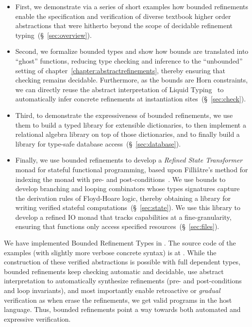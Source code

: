 \begin{itemize}
\item
First, we demonstrate via a series of short examples how bounded refinements
enable the specification and verification of diverse textbook higher order
abstractions that were hitherto beyond the scope of decidable refinement
typing~(\S~\ref{sec:overview}).

\item
Second, we formalize bounded types and show how bounds are translated
into ``ghost'' functions, reducing type checking and inference to the
``unbounded'' setting of chapter~\ref{chapter:abstractrefinements}, 
thereby ensuring that checking
remains decidable. Furthermore, as the bounds are Horn constraints, we
can directly reuse the abstract interpretation of Liquid Typing~\citep{LiquidPLDI08}
to automatically infer concrete refinements at instantiation
sites~(\S~\ref{sec:check}).

\item
Third, to demonstrate the expressiveness of bounded refinements, we
use them to build a typed library for extensible dictionaries, to
then implement a relational algebra library on top of those
dictionaries, and to finally build a library for type-safe
database access~(\S~\ref{sec:database}).

\item
Finally, we use bounded refinements to develop a \emph{Refined State Transformer}
monad for stateful functional programming, based upon Filli\^atre's method
for indexing the monad with pre- and post-conditions~\citep{Filliatre98}.
%
We use bounds to develop branching and looping combinators whose types
signatures capture the derivation rules of Floyd-Hoare logic, thereby
obtaining a library for writing verified stateful computations~(\S~\ref{sec:state}).
%
We use this library to develop a refined IO monad that tracks capabilities
at a fine-granularity, ensuring that functions only access specified
resources~(\S~\ref{sec:files}).
\end{itemize}

We have implemented Bounded Refinement Types in \toolname.
The source code of the examples (with slightly more verbose concrete syntax)
is at \cite{liquidhaskellgithub}.
%
While the construction of these verified abstractions is possible with full
dependent types, bounded refinements
%
keep checking automatic and decidable,
%
use abstract interpretation to automatically synthesize
refinements (\ie pre- and post-conditions and loop invariants),
and most importantly
%
enable retroactive or \emph{gradual} verification as when
erase the refinements, we get valid programs in the
host language.
%
Thus, bounded refinements point a way towards 
both automated and expressive verification. 
%
